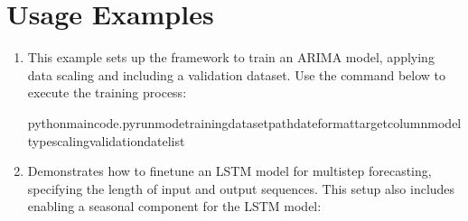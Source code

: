 \documentclass[letterpaper,10pt,english]{sphinxmanual}
\begin{document}
\section{Usage Examples}
\label{\detokenize{docs/parser_arguments:usage-examples}}\begin{enumerate}
%
\item {} 
\sphinxAtStartPar
{}

\sphinxAtStartPar
This example sets up the framework to train an ARIMA model, applying data scaling and including a validation dataset.
Use the command below to execute the training process:

\begin{sphinxVerbatim}[commandchars=\\\{\}]
pythonmain\PYGZus{}code.py\PYGZhy{}\PYGZhy{}run\PYGZus{}modetraining\PYGZhy{}\PYGZhy{}dataset\PYGZus{}path\PYGZhy{}\PYGZhy{}date\PYGZus{}format\PYGZhy{}\PYGZhy{}target\PYGZus{}column\PYGZhy{}\PYGZhy{}model\PYGZus{}type\PYGZhy{}\PYGZhy{}scaling\PYGZhy{}\PYGZhy{}validation\PYGZhy{}\PYGZhy{}date\PYGZus{}list
\end{sphinxVerbatim}

\item {} 
\sphinxAtStartPar
{}

\sphinxAtStartPar
Demonstrates how to fine\sphinxhyphen{}tune an LSTM model for multi\sphinxhyphen{}step forecasting, specifying the length of input and output sequences. This setup also includes enabling a seasonal component for the LSTM model:


\end{enumerate}
\end{document}
